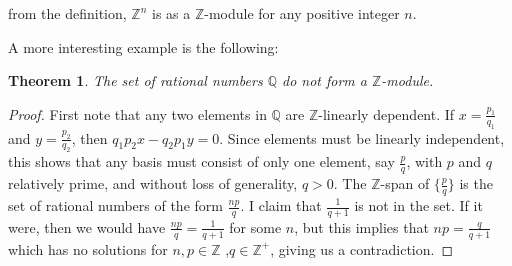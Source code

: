 \documentclass[12pt]{article}
\newtheorem{Theo}{Theorem}
\newcommand{\mb}{\mathbb}
\newcommand{\Z}{\mb{Z}}
\newcommand{\Q}{\mb{Q}}
\newcommand{\<}{\langle}
\renewcommand{\>}{\rangle}
\begin{document}
 from the definition, $\Z^n$ is  as a $\Z$-module for any positive integer $n$.

A more interesting example is the following:

\begin{Theo}
The set of rational numbers $\Q$ do \emph{not} form a  $\Z$-module.
\end{Theo}

\begin{proof}
First note that any two elements in $\Q$
are $\Z$-linearly dependent.  If $x=\frac{p_1}{q_1}$ and
$y=\frac{p_2}{q_2}$, then $q_1p_2x-q_2p_1y=0$.  Since  elements
must be linearly independent, this shows that any basis must consist
of only one element, say $\frac{p}{q}$, with $p$ and $q$ relatively prime, and without loss of generality, $q>0$.  The $\Z$-span of $\{\frac{p}{q}\}$ is the
set of rational numbers of the form $\frac{np}{q}$.  I claim that
$\frac{1}{q+1}$ is not in the set.  If it were, then we would have
$\frac{np}{q}=\frac{1}{q+1}$ for some $n$, but this implies that
$np=\frac{q}{q+1}$ which has no solutions for $n,p\in\Z$ ,$q\in\Z^+$, giving us
a contradiction.
\end{proof}
\end{document}
